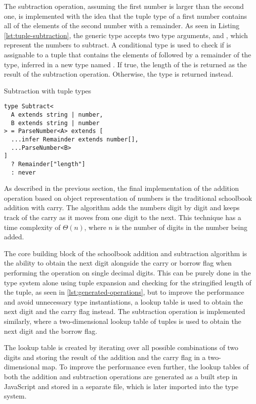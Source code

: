 The subtraction operation, assuming the first number is larger than the second one, is implemented with the idea that the tuple type of a first number contains all of the elements of the second number with a remainder. As seen in Listing \ref{lst:tuple-subtraction}, the  generic type accepts two type arguments,  and , which represent the numbers to subtract. A conditional type is used to check if  is assignable to a tuple that contains the elements of  followed by a remainder of the  type, inferred in a new type named . If true, the length of the  is returned as the result of the subtraction operation. Otherwise, the  type is returned instead.

\begin{listing}[ht]
  \caption{Subtraction with tuple types}\label{lst:tuple-subtraction}
  \begin{verbatim}
type Subtract<
  A extends string | number,
  B extends string | number
> = ParseNumber<A> extends [
  ...infer Remainder extends number[],
  ...ParseNumber<B>
]
  ? Remainder["length"]
  : never
\end{verbatim}
\end{listing}

As described in the previous section, the final implementation of the addition operation based on object representation of numbers is the traditional schoolbook addition with carry. The algorithm adds the numbers digit by digit and keeps track of the carry as it moves from one digit to the next. This technique has a time complexity of $\Theta(n)$, where $n$ is the number of digits in the number being added.

The core building block of the schoolbook addition and subtraction algorithm is the ability to obtain the next digit alongside the carry or borrow flag when performing the operation on single decimal digits. This can be purely done in the type system alone using tuple expansion and checking for the stringified length of the tuple, as seen in \ref{lst:generated-operations}, but to improve the performance and avoid unnecessary type instantiations, a lookup table is used to obtain the next digit and the carry flag instead. The subtraction operation is implemented similarly, where a two-dimensional lookup table of tuples is used to obtain the next digit and the borrow flag.

The lookup table is created by iterating over all possible combinations of two digits and storing the result of the addition and the carry flag in a two-dimensional map. To improve the performance even further, the lookup tables of both the addition and subtraction operations are generated as a built step in JavaScript and stored in a separate file, which is later imported into the type system.

